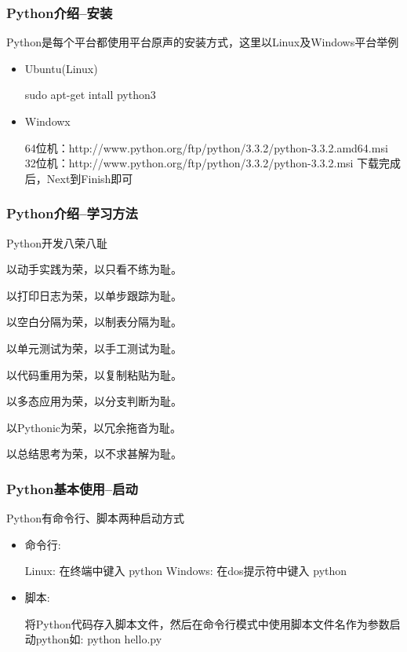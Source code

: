 \documentclass[xcolor=dvipsnames]{beamer}
\begin{document}
\begin{frame}
    \frametitle{Python介绍--安装}
    Python是每个平台都使用平台原声的安装方式，这里以Linux及Windows平台举例
    \begin{itemize}[<+->]
        \item
            Ubuntu(Linux)
            
            sudo apt-get intall python3 
        \item
            Windowx

            64位机：http://www.python.org/ftp/python/3.3.2/python-3.3.2.amd64.msi
            32位机：http://www.python.org/ftp/python/3.3.2/python-3.3.2.msi
            下载完成后，Next到Finish即可
    \end{itemize} 
\end{frame}

\begin{frame}
    \frametitle{Python介绍--学习方法}
    Python开发\alert{八荣八耻}
    \pause 

    以动手实践为荣，以只看不练为耻。
    \pause 

    以打印日志为荣，以单步跟踪为耻。
    \pause 

    以空白分隔为荣，以制表分隔为耻。
    \pause 

    以单元测试为荣，以手工测试为耻。
    \pause 

    以代码重用为荣，以复制粘贴为耻。
    \pause 

    以多态应用为荣，以分支判断为耻。
    \pause 

    以Pythonic为荣，以冗余拖沓为耻。
    \pause 

    以总结思考为荣，以不求甚解为耻。
\end{frame}

\begin{frame}
    \frametitle{Python基本使用--启动}
    Python有命令行、脚本两种启动方式
    \begin{itemize}[<+->]
        \item 命令行:
            
            Linux:   在终端中键入 python
            Windows: 在dos提示符中键入 python
        \item 脚本:

            将Python代码存入脚本文件，然后在命令行模式中使用脚本文件名作为参数启动python如: python hello.py
    \end{itemize} 
\end{frame}
\end{document}
